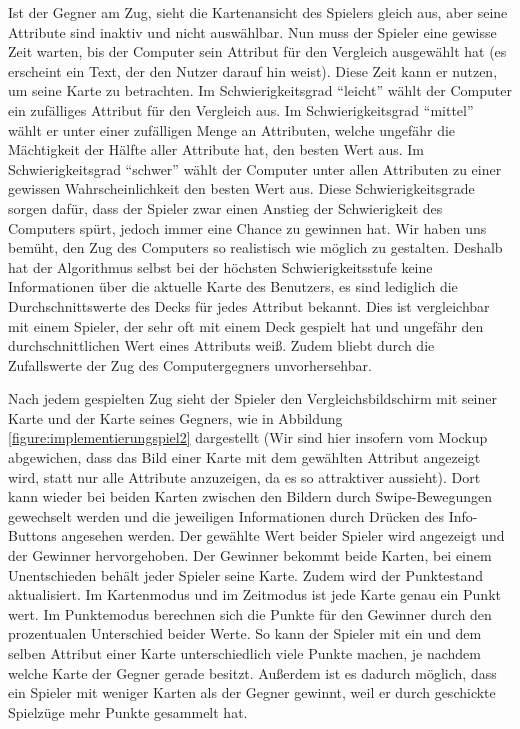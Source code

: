 Ist der Gegner am Zug, sieht die Kartenansicht des Spielers gleich aus, aber seine Attribute sind inaktiv und nicht auswählbar. Nun muss der Spieler eine gewisse Zeit warten, bis der Computer sein Attribut für den Vergleich ausgewählt hat (es erscheint ein Text, der den Nutzer darauf hin weist). Diese Zeit kann er nutzen, um seine Karte zu betrachten. Im Schwierigkeitsgrad ``leicht'' wählt der Computer ein zufälliges Attribut für den Vergleich aus. Im Schwierigkeitsgrad ``mittel'' wählt er unter einer zufälligen Menge an Attributen, welche ungefähr die Mächtigkeit der Hälfte aller Attribute hat, den besten Wert aus. Im Schwierigkeitsgrad ``schwer'' wählt der Computer unter allen Attributen zu einer gewissen Wahrscheinlichkeit den besten Wert aus. Diese Schwierigkeitsgrade sorgen dafür, dass der Spieler zwar einen Anstieg der Schwierigkeit des Computers spürt, jedoch immer eine Chance zu gewinnen hat. Wir haben uns bemüht, den Zug des Computers so realistisch wie möglich zu gestalten. Deshalb hat der Algorithmus selbst bei der höchsten Schwierigkeitsstufe keine Informationen über die aktuelle Karte des Benutzers, es sind lediglich die Durchschnittswerte des Decks für jedes Attribut bekannt. Dies ist vergleichbar mit einem Spieler, der sehr oft mit einem Deck gespielt hat und ungefähr den durchschnittlichen Wert eines Attributs weiß. Zudem bliebt durch die Zufallswerte der Zug des Computergegners unvorhersehbar.

Nach jedem gespielten Zug sieht der Spieler den Vergleichsbildschirm mit seiner Karte und der Karte seines Gegners, wie in Abbildung \ref{figure:implementierungspiel2}  dargestellt (Wir sind hier insofern vom Mockup abgewichen, dass das Bild einer Karte mit dem gewählten Attribut angezeigt wird, statt nur alle Attribute anzuzeigen, da es so attraktiver aussieht). Dort kann wieder bei beiden Karten zwischen den Bildern durch Swipe-Bewegungen gewechselt werden und die jeweiligen Informationen durch Drücken des Info-Buttons angesehen werden. Der gewählte Wert beider Spieler wird angezeigt und der Gewinner hervorgehoben. Der Gewinner bekommt beide Karten, bei einem Unentschieden behält jeder Spieler seine Karte. Zudem wird der Punktestand aktualisiert. Im Kartenmodus und im Zeitmodus ist jede Karte genau ein Punkt wert. Im Punktemodus berechnen sich die Punkte für den Gewinner durch den prozentualen Unterschied beider Werte. So kann der Spieler mit ein und dem selben Attribut einer Karte unterschiedlich viele Punkte machen, je nachdem welche Karte der Gegner gerade besitzt. Außerdem ist es dadurch möglich, dass ein Spieler mit weniger Karten als der Gegner gewinnt, weil er durch geschickte Spielzüge mehr Punkte gesammelt hat.\\

